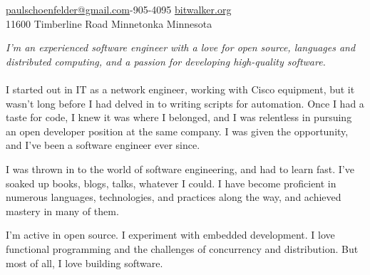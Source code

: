 \documentclass[10pt,a4paper]{article}
\begin{document}
\sloppy  %



\nobreakvspace{0.3em}  %

\noindent\href{mailto:paulschoenfelder@gmail.com}{paulschoenfelder\mbox{}@\mbox{}gmail.com}-905-4095\sbull
\href{http://bitwalker.org}{bitwalker.org}
\\
11600 Timberline Road\sbull
Minnetonka\sbull
Minnesota

\spacedhrule{0.9em}{-0.4em}  %


\vspace{-1.3em}  %
\begin{multicols}{2}  %
\noindent \emph{I'm an experienced software engineer with a love for open source, languages and distributed computing, and a passion for developing high-quality software.}
\\
\\
I started out in IT as a network engineer, working with Cisco equipment, but it wasn't long before I had delved in to writing scripts for automation. Once I had a taste for code, I knew it was where I belonged, and I was relentless in pursuing an open developer position at the same company. I was given the opportunity, and I've been a software engineer ever since.

I was thrown in to the world of software engineering, and had to learn fast. I've soaked up books, blogs, talks, whatever I could. I have become proficient in numerous languages, technologies, and practices along the way, and achieved mastery in many of them.

I'm active in open source. I experiment with embedded development. I love functional programming and the challenges of concurrency and distribution. But most of all, I love building software.
\end{multicols}


\spacedhrule{0em}{-0.4em}
\end{document}
